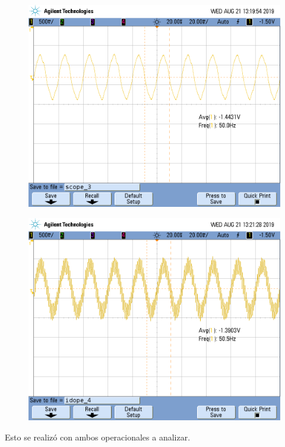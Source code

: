 \documentclass[a4paper]{article}
\begin{document}
\begin{figure}[H]
\centering
\begin{minipage}{.5\textwidth}
  \centering
  \includegraphics[width=.99\linewidth]{imagenes/IB+.png}
  \label{fig:ib+}
\end{minipage}%
\begin{minipage}{.5\textwidth}
  \centering
  \includegraphics[width=.99\linewidth]{imagenes/IB-.png}
  \label{fig:ib-}
\end{minipage}
\end{figure}
Esto se realizó con ambos operacionales a analizar.
\end{document}
